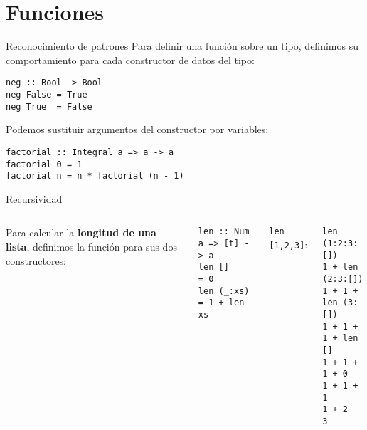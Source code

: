 \section{Funciones}

\begin{frame}[fragile]{Reconocimiento de patrones}
  Para definir una función sobre un tipo, definimos su comportamiento para cada
  constructor de datos del tipo:
  \begin{lstlisting}
neg :: Bool -> Bool
neg False = True
neg True  = False
  \end{lstlisting}

  \espacio

  Podemos sustituir argumentos del constructor por variables:
  \begin{lstlisting}
factorial :: Integral a => a -> a
factorial 0 = 1
factorial n = n * factorial (n - 1)
  \end{lstlisting}

\end{frame}

\begin{frame}[fragile]{Recursividad}

  \begin{columns}
  Para calcular la \textbf{longitud de una lista}, definimos la función para sus dos
  constructores:

  \espacio
  \begin{lstlisting}
len :: Num a => [t] -> a
len []     = 0
len (_:xs) = 1 + len xs
  \end{lstlisting}
\texttt{len [1,2,3]}:
  \begin{lstlisting}
len (1:2:3:[])
1 + len (2:3:[])
1 + 1 + len (3:[])
1 + 1 + 1 + len []
1 + 1 + 1 + 0
1 + 1 + 1
1 + 2
3
  \end{lstlisting}
\end{columns}
\end{frame}

